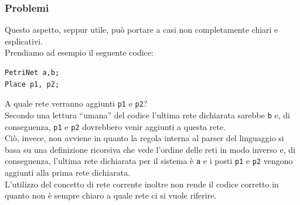 \documentclass[italian,12pt]{book}
\begin{document}
\subsubsection{Problemi}
Questo aspetto, seppur utile, può portare a casi non completamente chiari e esplicativi. \\
Prendiamo ad esempio il seguente codice:
\begin{verbatim}PetriNet a,b;
Place p1, p2;
\end{verbatim}
A quale rete verranno aggiunti {\tt p1} e {\tt p2}? \\
Secondo una lettura ``umana'' del codice l'ultima
rete dichiarata sarebbe {\tt b} e, di conseguenza, {\tt p1} e {\tt p2} dovrebbero venir aggiunti a
questa rete. \\
Ciò, invece, non avviene in quanto la regola interna al parser del linguaggio si basa su una definizione 
ricorsiva che vede l'ordine delle reti in modo inverso e, di conseguenza, l'ultima rete dichiarata per 
il sistema è {\tt a} e i posti {\tt p1} e {\tt p2} vengono aggiunti alla prima rete dichiarata.\\
L'utilizzo del concetto di rete corrente inoltre non rende il codice corretto in quanto non è sempre chiaro
a quale rete ci si vuole riferire.
\end{document}
